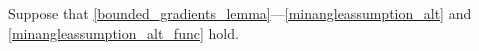 Suppose that \cref{bounded_gradients_lemma}---\cref{minangleassumption_alt} and \cref{minangleassumption_alt_func} hold.
